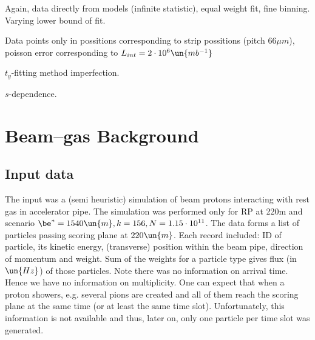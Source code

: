 Again, data directly from models (infinite statistic), equal weight fit, fine binning. Varying lower bound of fit.

Data points only in possitions corresponding to strip possitions (pitch $66\mu m$), poisson error corresponding to $L_{int} = 2\cdot10^{6}\un{mb^{-1}}$
\vfil\eject

$t_y$-fitting method imperfection.

$s$-dependence.
\bmfig
{}
\emfig


\vfil\eject
\chapter{Beam--gas Background}

\section{Input data}

The input was a (semi heuristic) simulation of beam protons interacting with rest gas in accelerator pipe. The simulation was performed only for RP at 220m and scenario $\be^*=1540\un{m}, k=156, N=1.15\cdot10^{11}$. The data forms a list of particles passing scoring plane at $220\un{m}$. Each record included: ID of particle, its kinetic energy, (transverse) position within the beam pipe, direction of momentum and weight. Sum of the weights for a particle type gives flux (in$\un{Hz}$) of those particles. Note there was no information on arrival time. Hence we have no information on multiplicity. One can expect that when a proton showers, e.g. several pions are created and all of them reach the scoring plane at the same time (or at least the same time slot). Unfortunately, this information is not available and thus, later on, only one particle per time slot was generated.


